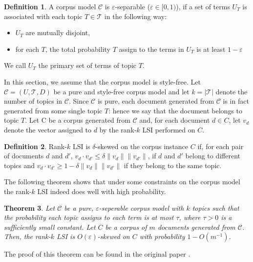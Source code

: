\documentclass[a4paper,11pt,DIV=15]{scrartcl} %
\renewcommand{\epsilon}{\varepsilon}
\theoremstyle{plain}
\newtheorem{theorem}{Theorem}
\theoremstyle{definition}
\newtheorem{definition}[theorem]{Definition}
\begin{document}
\begin{definition}
  A corpus model $\mathscr{C}$ is $\epsilon$-separable ($\epsilon \in [0,1)$), if a set of terms $U_T$ is associated with each topic $T \in \mathscr{T}$ in the following way:
\begin{itemize}
    \item $U_T$ are mutually disjoint,
    \item for each $T$, the total probability $T$ assign to the terms in $U_T$  is at least $1-\epsilon$
\end{itemize}
We call $U_T$ the primary set of terms of topic $T$.
\end{definition}

In this section, we assume that the corpus model is style-free.
Let $\mathscr{C} = (U,\mathscr{T}, D)$ be a pure and style-free corpus model and let $k = |\mathscr{T}|$ denote the number of topics in $\mathscr{C}$. Since $\mathscr{C}$ is pure, each document generated from $\mathscr{C}$ is in fact generated from some single topic $T$: hence we say that the document belongs to topic $T$.
Let C be a corpus generated from $\mathscr{C}$ and, for each document $d \in C$, let $v_d$ denote the vector assigned to $d$ by the rank-$k$ LSI performed on $C$.



\begin{definition}
    Rank-$k$ LSI is $\delta$-skewed on the corpus instance $C$ if, for each pair of documents $d$ and $d'$, $v_d \cdot v_{d'} \leq \delta \lVert v_d \rVert \lVert v_{d'}\rVert$,  if $d$ and $d'$ belong to different topics and $v_d \cdot v_{d'} \geq 1 - \delta  \lVert v_d \rVert \lVert v_{d'}\rVert$  if they belong to the same topic.
\end{definition}
The following theorem shows that under some constraints on the corpus model the rank-$k$ LSI indeed does well with high probability.

\begin{theorem}
\label{theorem: lsiperform}
    Let $\mathscr{C}$ be a pure, $\epsilon$-seperable corpus model with $k$ topics such that the probability each topic assigns to each term is at most $\tau$, where $\tau > 0$ is a sufficiently small constant. Let $C$ be a corpus of $m$ documents generated from $\mathscr{C}$. Then, the rank-$k$ LSI is $O(\epsilon)$-skewed on $C$ with probability $1-O(m^{-1})$.
\end{theorem}

The proof of this theorem can be found in the original paper \cite{APAPADIMITRIOU2000217}.
\end{document}
